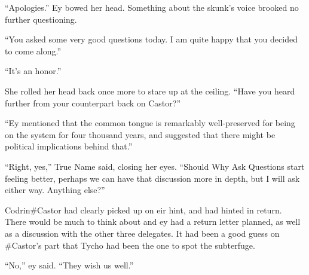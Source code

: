 ``Apologies.'' Ey bowed her head. Something about the skunk's voice brooked no further questioning.

``You asked some very good questions today. I am quite happy that you decided to come along.''

``It's an honor.''

She rolled her head back once more to stare up at the ceiling. ``Have you heard further from your counterpart back on Castor?''

``Ey mentioned that the common tongue is remarkably well-preserved for being on the system for four thousand years, and suggested that there might be political implications behind that.''

``Right, yes,'' True Name said, closing her eyes. ``Should Why Ask Questions start feeling better, perhaps we can have that discussion more in depth, but I will ask either way. Anything else?''

Codrin\#Castor had clearly picked up on eir hint, and had hinted in return. There would be much to think about and ey had a return letter planned, as well as a discussion with the other three delegates. It had been a good guess on \#Castor's part that Tycho had been the one to spot the subterfuge.

``No,'' ey said. ``They wish us well.''
